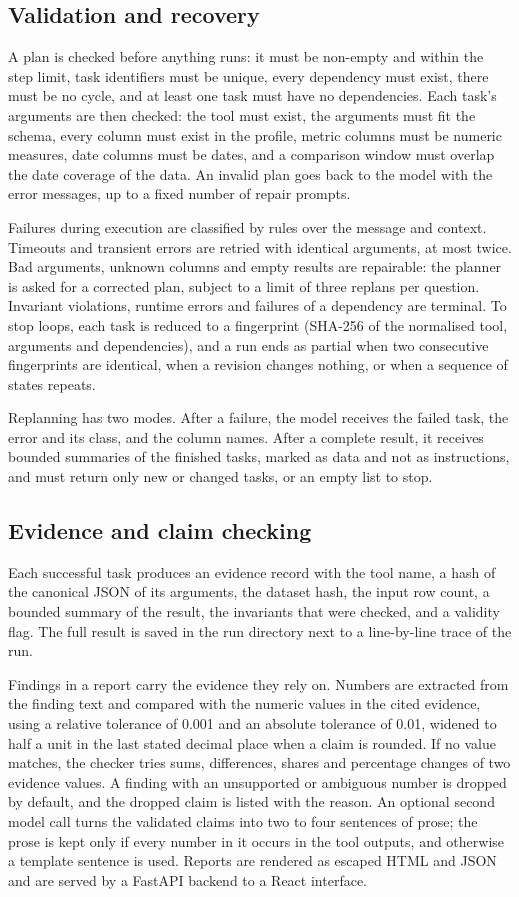 \subsection{Validation and recovery}
A plan is checked before anything runs: it must be non-empty and within the step limit, task identifiers must be unique, every dependency must exist, there must be no cycle, and at least one task must have no dependencies. Each task's arguments are then checked: the tool must exist, the arguments must fit the schema, every column must exist in the profile, metric columns must be numeric measures, date columns must be dates, and a comparison window must overlap the date coverage of the data. An invalid plan goes back to the model with the error messages, up to a fixed number of repair prompts.

Failures during execution are classified by rules over the message and context. Timeouts and transient errors are retried with identical arguments, at most twice. Bad arguments, unknown columns and empty results are repairable: the planner is asked for a corrected plan, subject to a limit of three replans per question. Invariant violations, runtime errors and failures of a dependency are terminal. To stop loops, each task is reduced to a fingerprint (SHA-256 of the normalised tool, arguments and dependencies), and a run ends as partial when two consecutive fingerprints are identical, when a revision changes nothing, or when a sequence of states repeats.

Replanning has two modes. After a failure, the model receives the failed task, the error and its class, and the column names. After a complete result, it receives bounded summaries of the finished tasks, marked as data and not as instructions, and must return only new or changed tasks, or an empty list to stop.

\subsection{Evidence and claim checking}
Each successful task produces an evidence record with the tool name, a hash of the canonical JSON of its arguments, the dataset hash, the input row count, a bounded summary of the result, the invariants that were checked, and a validity flag. The full result is saved in the run directory next to a line-by-line trace of the run.

Findings in a report carry the evidence they rely on. Numbers are extracted from the finding text and compared with the numeric values in the cited evidence, using a relative tolerance of 0.001 and an absolute tolerance of 0.01, widened to half a unit in the last stated decimal place when a claim is rounded. If no value matches, the checker tries sums, differences, shares and percentage changes of two evidence values. A finding with an unsupported or ambiguous number is dropped by default, and the dropped claim is listed with the reason. An optional second model call turns the validated claims into two to four sentences of prose; the prose is kept only if every number in it occurs in the tool outputs, and otherwise a template sentence is used. Reports are rendered as escaped HTML and JSON and are served by a FastAPI backend to a React interface.
